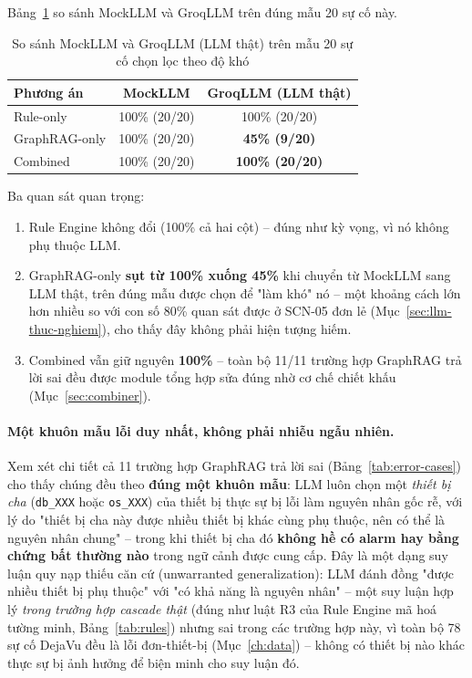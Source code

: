 \documentclass[12pt,a4paper]{report}
\newcommand{\code}[1]{\texttt{\small #1}}
\begin{document}
Bảng~\ref{tab:error-analysis} so sánh MockLLM và GroqLLM trên đúng mẫu 20 sự cố này.

\begin{table}[H]
\centering
\caption{So sánh MockLLM và GroqLLM (LLM thật) trên mẫu 20 sự cố chọn lọc theo độ khó}
\label{tab:error-analysis}
\begin{tabular}{@{}lcc@{}}
\toprule
Phương án & MockLLM & GroqLLM (LLM thật) \\
\midrule
Rule-only     & 100\% (20/20) & 100\% (20/20) \\
GraphRAG-only & 100\% (20/20) & \textbf{45\% (9/20)} \\
Combined      & 100\% (20/20) & \textbf{100\% (20/20)} \\
\bottomrule
\end{tabular}
\end{table}

Ba quan sát quan trọng:

\begin{enumerate}[label=(\arabic*)]
    \item Rule Engine không đổi (100\% cả hai cột) -- đúng như kỳ vọng, vì nó không phụ thuộc LLM.
    \item GraphRAG-only \textbf{sụt từ 100\% xuống 45\%} khi chuyển từ MockLLM sang LLM thật, trên
    đúng mẫu được chọn để "làm khó" nó -- một khoảng cách lớn hơn nhiều so với con số 80\% quan sát
    được ở SCN-05 đơn lẻ (Mục~\ref{sec:llm-thuc-nghiem}), cho thấy đây không phải hiện tượng hiếm.
    \item Combined vẫn giữ nguyên \textbf{100\%} -- toàn bộ 11/11 trường hợp GraphRAG trả lời sai
    đều được module tổng hợp sửa đúng nhờ cơ chế chiết khấu (Mục~\ref{sec:combiner}).
\end{enumerate}

\paragraph{Một khuôn mẫu lỗi duy nhất, không phải nhiễu ngẫu nhiên.} Xem xét chi tiết cả 11 trường
hợp GraphRAG trả lời sai (Bảng~\ref{tab:error-cases}) cho thấy chúng đều theo \textbf{đúng một khuôn
mẫu}: LLM luôn chọn một \emph{thiết bị cha} (\code{db\_XXX} hoặc \code{os\_XXX}) của thiết bị thực
sự bị lỗi làm nguyên nhân gốc rễ, với lý do "thiết bị cha này được nhiều thiết bị khác cùng phụ
thuộc, nên có thể là nguyên nhân chung" -- trong khi thiết bị cha đó \textbf{không hề có alarm hay
bằng chứng bất thường nào} trong ngữ cảnh được cung cấp. Đây là một dạng suy luận quy nạp thiếu căn
cứ (unwarranted generalization): LLM đánh đồng "được nhiều thiết bị phụ thuộc" với "có khả năng là
nguyên nhân" -- một suy luận hợp lý \emph{trong trường hợp cascade thật} (đúng như luật R3 của Rule
Engine mã hoá tường minh, Bảng~\ref{tab:rules}) nhưng sai trong các trường hợp này, vì toàn bộ 78 sự
cố DejaVu đều là lỗi đơn-thiết-bị (Mục~\ref{ch:data}) -- không có thiết bị nào khác thực sự bị ảnh
hưởng để biện minh cho suy luận đó.
\end{document}
